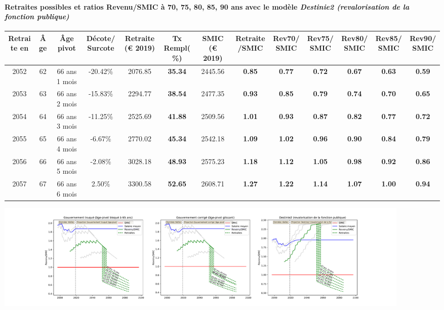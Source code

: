 \paragraph{Retraites possibles et ratios Revenu/SMIC à 70, 75, 80, 85, 90 ans avec le modèle \emph{Destinie2 (revalorisation de la fonction publique)}}  
 
{ \scriptsize \begin{center} 
\begin{tabular}[htb]{|c|c||c|c||c|c||c||c|c|c|c|c|c|} 
\hline 
 Retraite en &  Âge &  Âge pivot &  Décote/Surcote &  Retraite (\euro{} 2019) &  Tx Rempl(\%) &  SMIC (\euro{} 2019) &  Retraite/SMIC &  Rev70/SMIC &  Rev75/SMIC &  Rev80/SMIC &  Rev85/SMIC &  Rev90/SMIC \\ 
\hline \hline 
 2052 &  62 &  66 ans 1 mois &  -20.42\% &  2076.85 &  {\bf 35.34} &  2445.56 &  {\bf {\color{red} 0.85}} &  {\bf {\color{red} 0.77}} &  {\bf {\color{red} 0.72}} &  {\bf {\color{red} 0.67}} &  {\bf {\color{red} 0.63}} &  {\bf {\color{red} 0.59}} \\ 
\hline 
 2053 &  63 &  66 ans 2 mois &  -15.83\% &  2294.77 &  {\bf 38.54} &  2477.35 &  {\bf {\color{red} 0.93}} &  {\bf {\color{red} 0.85}} &  {\bf {\color{red} 0.79}} &  {\bf {\color{red} 0.74}} &  {\bf {\color{red} 0.70}} &  {\bf {\color{red} 0.65}} \\ 
\hline 
 2054 &  64 &  66 ans 3 mois &  -11.25\% &  2525.69 &  {\bf 41.88} &  2509.56 &  {\bf 1.01} &  {\bf {\color{red} 0.93}} &  {\bf {\color{red} 0.87}} &  {\bf {\color{red} 0.82}} &  {\bf {\color{red} 0.77}} &  {\bf {\color{red} 0.72}} \\ 
\hline 
 2055 &  65 &  66 ans 4 mois &  -6.67\% &  2770.02 &  {\bf 45.34} &  2542.18 &  {\bf 1.09} &  {\bf 1.02} &  {\bf {\color{red} 0.96}} &  {\bf {\color{red} 0.90}} &  {\bf {\color{red} 0.84}} &  {\bf {\color{red} 0.79}} \\ 
\hline 
 2056 &  66 &  66 ans 5 mois &  -2.08\% &  3028.18 &  {\bf 48.93} &  2575.23 &  {\bf 1.18} &  {\bf 1.12} &  {\bf 1.05} &  {\bf {\color{red} 0.98}} &  {\bf {\color{red} 0.92}} &  {\bf {\color{red} 0.86}} \\ 
\hline 
 2057 &  67 &  66 ans 6 mois &  2.50\% &  3300.58 &  {\bf 52.65} &  2608.71 &  {\bf 1.27} &  {\bf 1.22} &  {\bf 1.14} &  {\bf 1.07} &  {\bf 1.00} &  {\bf {\color{red} 0.94}} \\ 
\hline 
\hline 
\end{tabular} 
\end{center} } 

 \begin{center}\includegraphics[width=0.9\textwidth]{fig/Infirmier_1990_22_dest_retraite.pdf}\end{center} \label{fig/Infirmier_1990_22_dest_retraite.pdf} 

